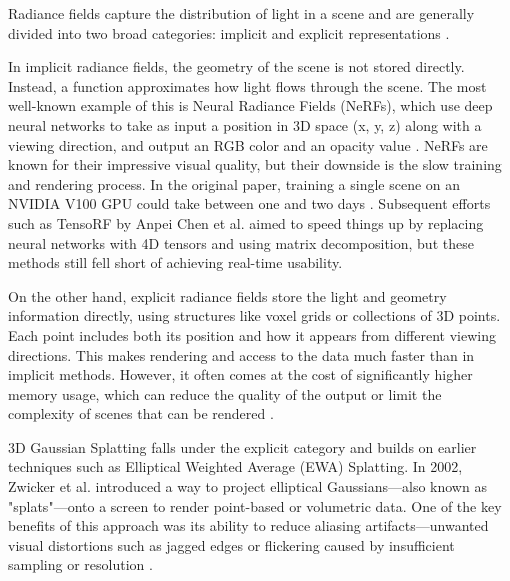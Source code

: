 \documentclass[10pt,twocolumn]{article}
\begin{document}
Radiance fields capture the distribution of light in a scene and are generally divided into two broad categories: implicit and explicit representations \cite{chen2025survey3dgaussiansplatting}.

In implicit radiance fields, the geometry of the scene is not stored directly. Instead, a function approximates how light flows through the scene. The most well-known example of this is Neural Radiance Fields (NeRFs), which use deep neural networks to take as input a position in 3D space (x, y, z) along with a viewing direction, and output an RGB color and an opacity value \cite{mildenhall2020nerfrepresentingscenesneural}. NeRFs are known for their impressive visual quality, but their downside is the slow training and rendering process. In the original paper, training a single scene on an NVIDIA V100 GPU could take between one and two days \cite{mildenhall2020nerfrepresentingscenesneural}. Subsequent efforts such as TensoRF by Anpei Chen et al. \cite{chen2022tensorftensorialradiancefields} aimed to speed things up by replacing neural networks with 4D tensors and using matrix decomposition, but these methods still fell short of achieving real-time usability.

On the other hand, explicit radiance fields store the light and geometry information directly, using structures like voxel grids or collections of 3D points. Each point includes both its position and how it appears from different viewing directions. This makes rendering and access to the data much faster than in implicit methods. However, it often comes at the cost of significantly higher memory usage, which can reduce the quality of the output or limit the complexity of scenes that can be rendered \cite{chen2025survey3dgaussiansplatting}.

3D Gaussian Splatting falls under the explicit category and builds on earlier techniques such as Elliptical Weighted Average (EWA) Splatting. In 2002, Zwicker et al. \cite{zwicker2002ewa} introduced a way to project elliptical Gaussians—also known as "splats"—onto a screen to render point-based or volumetric data. One of the key benefits of this approach was its ability to reduce aliasing artifacts—unwanted visual distortions such as jagged edges or flickering caused by insufficient sampling or resolution \cite{zwicker2002ewa}.
\end{document}
